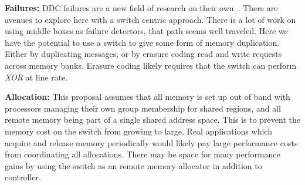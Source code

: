 \textbf{Failures:}
DDC failures are a new field of research on their
own~\cite{amanda-hotnets}. There are avenues to explore here with a
switch centric approach. There is a lot of work on using middle boxes
as failure detectors, that path seems well traveled. Here we have the
potential to use a switch to give some form of memory duplication.
Either by duplicating messages, or by erasure coding read and write
requests across memory banks. Erasure coding likely requires that the
switch can perform \textit{XOR} at line rate.

\textbf{Allocation:}
This proposal assumes that all memory is set up out of band with
processors managing their own group membership for shared regions, and
all remote memory being part of a single shared address space. This is
to prevent the memory cost on the switch from growing to large. Real
applications which acquire and release memory periodically would likely
pay large performance costs from coordinating all allocations. There
may be space for many performance gains by using the switch as an
remote memory allocator in addition to controller.

